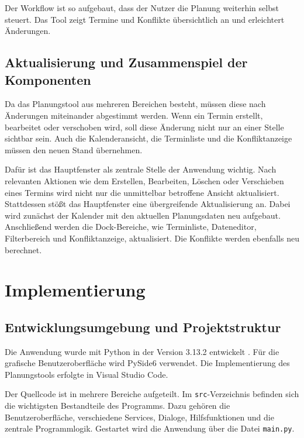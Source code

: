 \documentclass[12pt,a4paper]{article}
\begin{document}
Der Workflow ist so aufgebaut, dass der Nutzer die Planung weiterhin selbst steuert. Das Tool zeigt Termine und Konflikte übersichtlich an und erleichtert Änderungen.

\subsection{Aktualisierung und Zusammenspiel der Komponenten}

Da das Planungstool aus mehreren Bereichen besteht, müssen diese nach Änderungen miteinander abgestimmt werden. Wenn ein Termin erstellt, bearbeitet oder verschoben wird, soll diese Änderung nicht nur an einer Stelle sichtbar sein. Auch die Kalenderansicht, die Terminliste und die Konfliktanzeige müssen den neuen Stand übernehmen.

Dafür ist das Hauptfenster als zentrale Stelle der Anwendung wichtig. 
Nach relevanten Aktionen wie dem Erstellen, Bearbeiten, Löschen oder Verschieben eines Termins wird nicht nur die unmittelbar betroffene Ansicht aktualisiert. Stattdessen stößt das Hauptfenster eine übergreifende Aktualisierung an.
Dabei wird zunächst der Kalender mit den aktuellen Planungsdaten neu aufgebaut. Anschließend werden die Dock-Bereiche, wie Terminliste, Dateneditor, Filterbereich und Konfliktanzeige, aktualisiert. Die Konflikte werden ebenfalls neu berechnet.


\clearpage

\section{Implementierung}

\subsection{Entwicklungsumgebung und Projektstruktur}

Die Anwendung wurde mit Python in der Version 3.13.2 entwickelt \cite{python3132}. Für die grafische Benutzeroberfläche wird PySide6 verwendet. Die Implementierung des Planungstools erfolgte in Visual Studio Code.

Der Quellcode ist in mehrere Bereiche aufgeteilt. Im \texttt{src}-Verzeichnis befinden sich die wichtigsten Bestandteile des Programms. Dazu gehören die Benutzeroberfläche, verschiedene Services, Dialoge, Hilfsfunktionen und die zentrale Programmlogik. Gestartet wird die Anwendung über die Datei \texttt{main.py}.
\end{document}

